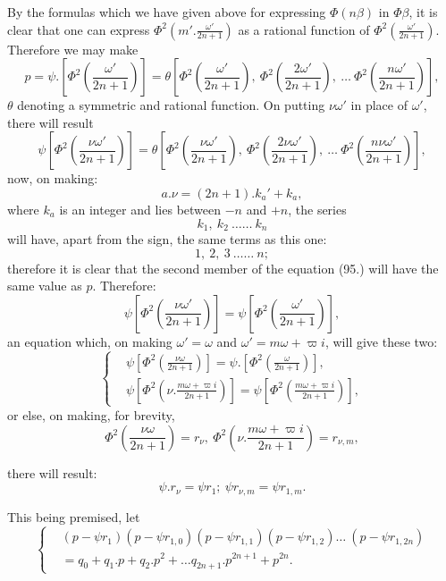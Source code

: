 \documentclass{article}
\begin{document}
By the formulas which we have given above for expressing $\Phi(n\beta)$ in $\Phi\beta$, it is clear that one can express $\Phi^{2}\left(m'.\frac{\omega'}{2n+1}\right)$ as a rational function of $\Phi^{2}\left(\frac{\omega'}{2n+1}\right)$. Therefore we may make
\[ p=\psi.\left[\Phi^{2}\left(\frac{\omega'}{2n+1}\right)\right]=\theta\left[\Phi^{2}\left(\frac{\omega'}{2n+1}\right),\ \Phi^{2}\left(\frac{2\omega'}{2n+1}\right),\ \ldots\ \Phi^{2}\left(\frac{n\omega'}{2n+1}\right)\right], \tag{94.} \]
$\theta$ denoting a symmetric and rational function. On putting $\nu\omega'$ in place of $\omega'$, there will result
\[ \psi\left[\Phi^{2}\left(\frac{\nu\omega'}{2n+1}\right)\right]=\theta\left[\Phi^{2}\left(\frac{\nu\omega'}{2n+1}\right),\ \Phi^{2}\left(\frac{2\nu\omega'}{2n+1}\right),\ \ldots\ \Phi^{2}\left(\frac{n\nu\omega'}{2n+1}\right)\right], \tag{95.} \]
now, on making:
\[ a.\nu=(2n+1).k_{a}'+k_{a}, \]
where $k_{a}$ is an integer and lies between $-n$ and $+n$, the series
\[ k_{1},\ k_{2}\ \ldots\ldots\ k_{n} \]
will have, apart from the sign, the same terms as this one:
\[ 1,\ 2,\ 3\ \ldots\ldots\ n; \]
therefore it is clear that the second member of the equation (95.) will have the same value as $p$. Therefore:
\[ \psi\left[\Phi^{2}\left(\frac{\nu\omega'}{2n+1}\right)\right]=\psi\left[\Phi^{2}\left(\frac{\omega'}{2n+1}\right)\right], \tag{96.} \]
an equation which, on making $\omega'=\omega$ and $\omega'=m\omega+\varpi i$, will give these two:
\[ \left\{\begin{aligned}
&\psi\left[\Phi^{2}\left(\frac{\nu\omega}{2n+1}\right)\right]=\psi.\left[\Phi^{2}\left(\frac{\omega}{2n+1}\right)\right],\\
&\psi\left[\Phi^{2}\left(\nu.\frac{m\omega+\varpi i}{2n+1}\right)\right]=\psi\left[\Phi^{2}\left(\frac{m\omega+\varpi i}{2n+1}\right)\right],
\end{aligned}\right. \tag{97.} \]
or else, on making, for brevity,
\[ \Phi^{2}\left(\frac{\nu\omega}{2n+1}\right)=r_{\nu},\ \Phi^{2}\left(\nu.\frac{m\omega+\varpi i}{2n+1}\right)=r_{\nu,m}, \tag{98.} \]

there will result:
\[ \psi.r_{\nu}=\psi r_{1};\ \psi r_{\nu,m}=\psi r_{1,m}. \tag{99.} \]

This being premised, let
\[ \left\{\begin{aligned}
&(p-\psi r_{1})(p-\psi r_{1,0})(p-\psi r_{1,1})(p-\psi r_{1,2})\ldots\ (p-\psi r_{1,2n})\\
&=q_{0}+q_{1}.p+q_{2}.p^{2}+\ldots q_{2n+1}.p^{2n+1}+p^{2n}.
\end{aligned}\right. \tag{100.} \]
\end{document}
